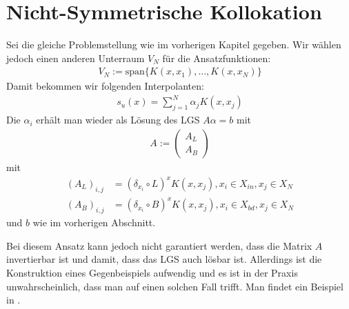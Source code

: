 \section{Nicht-Symmetrische Kollokation}
\label{sec:NSymKol}
Sei die gleiche Problemstellung wie im vorherigen Kapitel gegeben. Wir wählen jedoch einen anderen Unterraum $V_N$ für die Ansatzfunktionen:
\begin{align*}
V_N := \text{span} \{K(x,x_1), \dots, K(x,x_N) \}
\end{align*}
Damit bekommen wir folgenden Interpolanten:
\begin{align*}
s_u(x) = \sum_{j=1}^N \alpha_j K(x,x_j)
\end{align*}
Die $\alpha_i$ erhält man wieder als Lösung des \ac{LGS} $A \alpha = b$ mit
\begin{align*}
A := \begin{pmatrix}
A_L \\ 
A_B
\end{pmatrix} 
\end{align*}
mit
\begin{align*}
(A_L)_{i,j} &= (\delta_{x_i} \circ L)^x K(x,x_j), x_i \in X_{in}, x_j \in X_N\\
(A_B)_{i,j} &= (\delta_{x_i} \circ B)^x K(x,x_j), x_i \in X_{bd}, x_j \in X_N
\end{align*}
und
$b$ wie im vorherigen Abschnitt.

Bei diesem Ansatz kann jedoch nicht garantiert werden, dass die Matrix $A$ invertierbar ist und damit, dass das \ac{LGS} auch lösbar ist. Allerdings ist die Konstruktion eines Gegenbeispiels aufwendig und es ist in der Praxis unwahrscheinlich, dass man auf einen solchen Fall trifft. Man findet ein Beispiel in \textcite{Hon.2001}.
